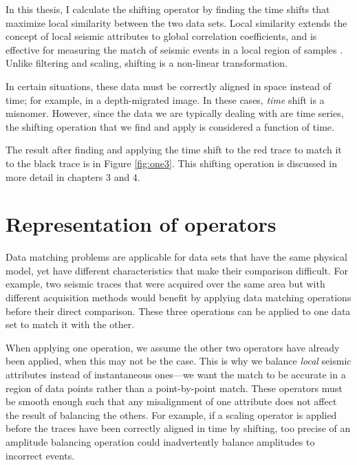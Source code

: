 In this thesis, I calculate the shifting operator by finding the time shifts that maximize local similarity between the two data sets.
Local similarity extends the concept of local seismic attributes to global correlation coefficients, and is effective for measuring the match of seismic events in a local region of samples \cite[]{attr}.
Unlike filtering and scaling, shifting is a non-linear transformation.

In certain situations, these data must be correctly aligned in space instead of time; for example, in a depth-migrated image.
In these cases, {\em time} shift is a misnomer. 
However, since the data we are typically dealing with are time series, the shifting operation that we find and apply is considered a function of time.

The result after finding and applying the time shift to the red trace to match it to the black trace is in Figure \ref{fig:one3}.
This shifting operation is discussed in more detail in chapters 3 and 4.


\section{Representation of operators}
Data matching problems are applicable for data sets that have the same physical model, yet have different characteristics that make their comparison difficult.
For example, two seismic traces that were acquired over the same area but with different acquisition methods would benefit by applying data matching operations before their direct comparison. 
These three operations can be applied to one data set to match it with the other.

When applying one operation, we assume the other two operators have already been applied, when this may not be the case.
This is why we balance {\em local} seismic attributes instead of instantaneous ones---we want the match to be accurate in a region of data points rather than a point-by-point match.
These operators must be smooth enough such that any misalignment of one attribute does not affect the result of balancing the others.
For example, if a scaling operator is applied before the traces have been correctly aligned in time by shifting, 
too precise of an amplitude balancing operation could inadvertently balance amplitudes to incorrect events.

